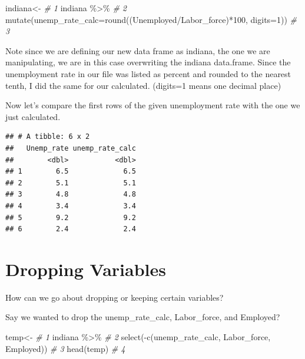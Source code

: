 \documentclass[
]{book}
\newenvironment{Shaded}{\begin{snugshade}}{\end{snugshade}}
\newcommand{\AttributeTok}[1]{\textcolor[rgb]{0.77,0.63,0.00}{#1}}
\newcommand{\CommentTok}[1]{\textcolor[rgb]{0.56,0.35,0.01}{\textit{#1}}}
\newcommand{\DecValTok}[1]{\textcolor[rgb]{0.00,0.00,0.81}{#1}}
\newcommand{\FunctionTok}[1]{\textcolor[rgb]{0.00,0.00,0.00}{#1}}
\newcommand{\NormalTok}[1]{#1}
\newcommand{\OtherTok}[1]{\textcolor[rgb]{0.56,0.35,0.01}{#1}}
\newcommand{\SpecialCharTok}[1]{\textcolor[rgb]{0.00,0.00,0.00}{#1}}
\begin{document}
\begin{Shaded}
\begin{Highlighting}[]
\NormalTok{indiana}\OtherTok{\textless{}{-}}                                                                \CommentTok{\# 1}
\NormalTok{  indiana }\SpecialCharTok{\%\textgreater{}\%}                                                            \CommentTok{\# 2}
  \FunctionTok{mutate}\NormalTok{(}\AttributeTok{unemp\_rate\_calc=}\FunctionTok{round}\NormalTok{((Unemployed}\SpecialCharTok{/}\NormalTok{Labor\_force)}\SpecialCharTok{*}\DecValTok{100}\NormalTok{, }\AttributeTok{digits=}\DecValTok{1}\NormalTok{))  }\CommentTok{\# 3}
\end{Highlighting}
\end{Shaded}

Note since we are defining our new data frame as indiana, the one we are manipulating, we are in this case overwriting the indiana data.frame. Since the unemployment rate in our file was listed as percent and rounded to the nearest tenth, I did the same for our calculated. (digits=1 means one decimal place)

Now let's compare the first rows of the given unemployment rate with the one we just calculated.

\begin{verbatim}
## # A tibble: 6 x 2
##   Unemp_rate unemp_rate_calc
##        <dbl>           <dbl>
## 1        6.5             6.5
## 2        5.1             5.1
## 3        4.8             4.8
## 4        3.4             3.4
## 5        9.2             9.2
## 6        2.4             2.4
\end{verbatim}

\hypertarget{dropping-variables}{%
\section{Dropping Variables}\label{dropping-variables}}

How can we go about dropping or keeping certain variables?

Say we wanted to drop the unemp\_rate\_calc, Labor\_force, and Employed?

\begin{Shaded}
\begin{Highlighting}[]
\NormalTok{temp}\OtherTok{\textless{}{-}}                                                 \CommentTok{\# 1}
\NormalTok{  indiana }\SpecialCharTok{\%\textgreater{}\%}                                          \CommentTok{\# 2}
  \FunctionTok{select}\NormalTok{(}\SpecialCharTok{{-}}\FunctionTok{c}\NormalTok{(unemp\_rate\_calc, Labor\_force,  Employed))  }\CommentTok{\# 3}
\FunctionTok{head}\NormalTok{(temp)                                             }\CommentTok{\# 4}
\end{Highlighting}
\end{Shaded}
\end{document}
